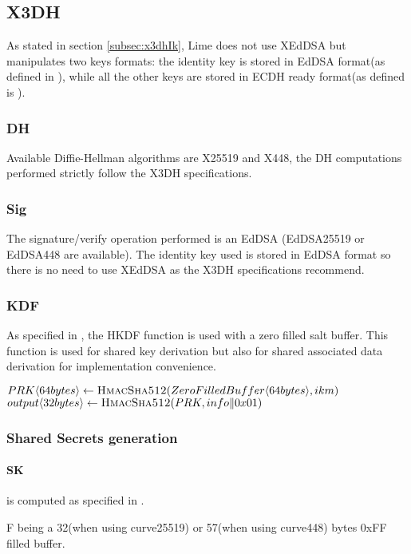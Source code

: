 \documentclass[a4paper,11pt]{article}
\begin{document}
  \subsection{X3DH}
    As stated in section \ref{subsec:x3dhIk}, Lime does not use XEdDSA but manipulates two keys formats: the identity key is stored in EdDSA format(as defined in \cite{rfc8032}), while all the other keys are stored in ECDH ready format(as defined is \cite{rfc7748}).
    \subsubsection{DH}
      Available Diffie-Hellman algorithms are X25519 and X448, the DH computations performed strictly follow the X3DH specifications.
    \subsubsection{Sig}
      The signature/verify operation performed is an EdDSA (EdDSA25519 or EdDSA448 are available). The identity key used is stored in EdDSA format so there is no need to use XEdDSA as the X3DH specifications recommend.
    \subsubsection{KDF}
      As specified in \cite[section 2.2]{x3dh}, the HKDF function\cite{rfc5869} is used with a zero filled salt buffer. This function is used for shared key derivation but also for shared associated data derivation for implementation convenience.
      \begin{algorithmic}
        \Statex
          \State $PRK\langle 64bytes\rangle  \gets \Call{HmacSha512}{ZeroFilledBuffer\langle 64bytes\rangle, ikm}$
          \State $output\langle 32bytes\rangle \gets \Call{HmacSha512}{PRK, info\Arrowvert 0x01}$
          \State {}
        \EndFunction
      \end{algorithmic}
    \subsubsection{Shared Secrets generation}
      \paragraph{SK}is computed as specified in \cite[section 3.3]{x3dh}.
        F being a 32(when using curve25519) or 57(when using curve448) bytes 0xFF filled buffer.
\end{document}
